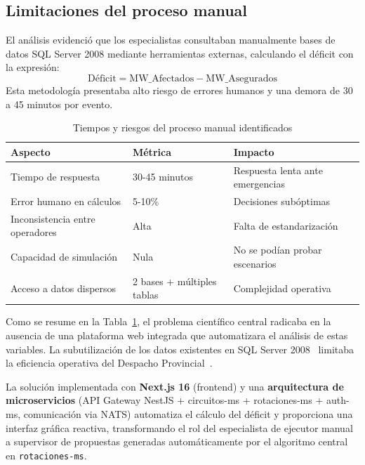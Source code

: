 \subsection{Limitaciones del proceso manual}
El análisis evidenció que los especialistas consultaban manualmente bases de datos SQL Server 2008 mediante herramientas externas, calculando el déficit con la expresión:
\[
\text{Déficit} = \text{MW\_Afectados} - \text{MW\_Asegurados}
\]
Esta metodología presentaba alto riesgo de errores humanos y una demora de 30 a 45 minutos por evento.

\begin{table}[H]
\centering
\small
\begin{tabular}{|p{4cm}|p{3cm}|p{5cm}|}
\hline
\textbf{Aspecto} & \textbf{Métrica} & \textbf{Impacto} \\ \hline
Tiempo de respuesta & 30-45 minutos & Respuesta lenta ante emergencias \\ \hline
Error humano en cálculos & 5-10\% & Decisiones subóptimas \\ \hline
Inconsistencia entre operadores & Alta & Falta de estandarización \\ \hline
Capacidad de simulación & Nula & No se podían probar escenarios \\ \hline
Acceso a datos dispersos & 2 bases + múltiples tablas & Complejidad operativa \\ \hline
\end{tabular}
\caption{Tiempos y riesgos del proceso manual identificados}
\label{tab:problemas_manual}
\end{table}

Como se resume en la Tabla~\ref{tab:problemas_manual}, el problema científico central radicaba en la ausencia de una plataforma web integrada que automatizara el análisis de estas variables. La subutilización de los datos existentes en SQL Server 2008~\citep{jones2019} limitaba la eficiencia operativa del Despacho Provincial~\citep{ministerio2023}.

La solución implementada con \textbf{Next.js 16} (frontend) y una \textbf{arquitectura de microservicios} (API Gateway NestJS + circuitos-ms + rotaciones-ms + auth-ms, comunicación via NATS) automatiza el cálculo del déficit y proporciona una interfaz gráfica reactiva, transformando el rol del especialista de ejecutor manual a supervisor de propuestas generadas automáticamente por el algoritmo central en \texttt{rotaciones-ms}.

